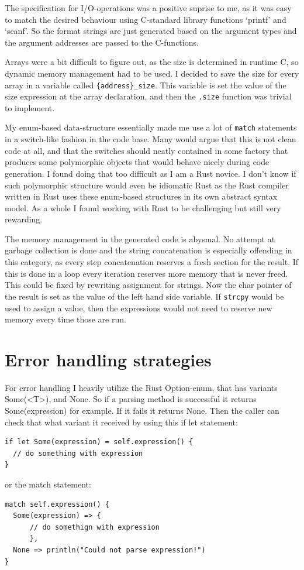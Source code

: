 \documentclass[12pt,a4paper]{article}
\begin{document}
The specification for I/O-operations was a positive suprise to me, as it was
easy to match the desired behaviour using C-standard library functions
`printf' and `scanf'. So the format strings are just generated based
on the argument types and the argument addresses are passed to the
C-functions.

Arrays were a bit difficult to figure out, as the size is determined in runtime
C, so dynamic memory management had to be used. I decided to save the size for
every array in a variable called \texttt{\{address\}\_size}.  This variable is
set the value of the size expression at the array declaration, and then the
\texttt{.size} function was trivial to implement.

My enum-based data-structure essentially made me use a lot of \texttt{match}
statements in a switch-like fashion in the code base. Many would argue that
this is not clean code at all, and that the switches should neatly contained in
some factory that produces some polymorphic objects that would behave nicely
during code generation.  I found doing that too difficult as I am a Rust
novice. I don't know if such polymorphic structure would even be idiomatic Rust
as the Rust compiler written in Rust uses these enum-based structures in its
own abstract syntax model. As a whole I found working with Rust to be
challenging but still very rewarding.

The memory management in the generated code is abysmal. No attempt at garbage
collection is done and the string concatenation is especially offending in this
category, as every step concatenation reserves a fresh section for the result.
If this is done in a loop every iteration reserves more memory that is 
never freed. This could be fixed by rewriting assignment for strings.
Now the char pointer of the result is set as the value of the left hand
side variable. If \texttt{strcpy} would be used to assign a value, then
the expressions would not need to reserve new memory every time those are run.


\section{Error handling strategies}

For error handling I heavily utilize the Rust Option-enum, that
has variants Some(<T>), and None. So if a parsing method
is successful it returns Some(expression) for example.
If it fails it returns None. Then the caller can check that
what variant it received by using this if let statement: 
\begin{verbatim}
if let Some(expression) = self.expression() {
  // do something with expression
}
\end{verbatim}
or the match statement:
\begin{verbatim}
match self.expression() {
  Some(expression) => {
      // do somethign with expression
      },
  None => println("Could not parse expression!")
}
\end{verbatim}
\end{document}

